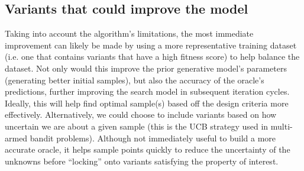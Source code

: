 \documentclass{article}
\begin{document}
\subsection{Variants that could improve the model}
\label{sec:appendix-variants}
Taking into account the algorithm's limitations, the most immediate improvement
can likely be made by using a more representative training dataset (i.e. one
that contains variants that have a high fitness score) to help balance the
dataset. Not only would this improve the prior generative model's parameters
(generating better initial samples), but also the accuracy of the oracle's
predictions, further improving the search model in subsequent iteration cycles.
Ideally, this will help find optimal sample(s) based off the design criteria
more effectively. Alternatively, we could choose to include variants based on
how uncertain we are about a given sample (this is the UCB strategy used in
multi-armed bandit problems). Although not immediately useful to build a more
accurate oracle, it helps sample points quickly to reduce the uncertainty of the
unknowns before ``locking'' onto variants satisfying the property of interest.
\end{document}
